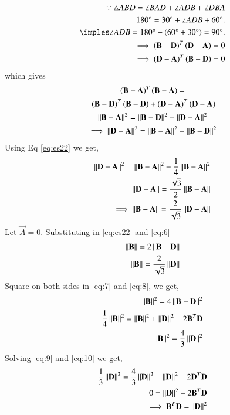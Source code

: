 \documentclass[journal,12pt,twocolumn]{IEEEtran}
\begin{document}
\begin{align}
\because \triangle ABD = \angle BAD + \angle ADB + \angle DBA\\
180\degree = 30\degree + \angle ADB + 60\degree.\\
\imples \angle ADB = 180\degree -\brak{60\degree + 30\degree} = 90\degree.\\
  \implies\brak{\vec{B-D}}^{T}\brak{\vec{D-A}}=0\\ \implies\brak{\vec{D-A}}^{T}\brak{\vec{B-D}} =0
\end{align}
which gives
\begin{multline}
    \brak{\vec{B-A}}^{T}\brak{\vec{B-A}} =\\\ \brak{\vec{B-D}}^{T}\brak{\vec{B-D}} + \brak{\vec{D-A}}^{T}\brak{\vec{D-A}}\\
    \norm{\vec{B-A}}^2=\norm{\vec{B-D}}^2 + \norm{\vec{D-A}}^2\\
    \implies\norm{\vec{D-A}}^2=\norm{\vec{B-A}}^2-\norm{\vec{B-D}}^2\label{eq:5}
\end{multline}
Using Eq \eqref{eq:es22} we get,
\begin{align}
\left\lVert\mathbf{D-A}\right\rVert^2=\left\lVert\mathbf{B-A}\right\rVert^2-\frac{1}{4}\left\lVert\mathbf{B-A}\right\rVert^2\label{eq:24}\\
 \left\lVert\mathbf{D-A}\right\rVert=\frac{\sqrt{3}}{2}\left\lVert\mathbf{B-A}\right\rVert\\
  \implies\left\lVert\mathbf{B-A}\right\rVert = \frac{2}{\sqrt{3}}\left\lVert\mathbf{D-A}\right\rVert\label{eq:6}
\end{align}
Let $\vec{A}=0$. Substituting in \eqref{eq:es22} and \eqref{eq:6}
\begin{align}
    \label{eq:7}\left\lVert\mathbf{B}\right\rVert=2\left\lVert\mathbf{B-D}\right\rVert\\
    \label{eq:8}\left\lVert\mathbf{B}\right\rVert=\frac{2}{\sqrt{3}}\left\lVert\mathbf{D}\right\rVert
\end{align}
Square on both sides in \eqref{eq:7} and \eqref{eq:8}, we get,
\begin{align}
    \left\lVert\mathbf{B}\right\rVert^2=4\left\lVert\mathbf{B-D}\right\rVert^2\\
    \frac{1}{4}\left\lVert\mathbf{B}\right\rVert^2=\left\lVert\mathbf{B}\right\rVert^2+\left\lVert\mathbf{D}\right\rVert^2-2\mathbf{B}^T\mathbf{D}\label{eq:9}\\
\left\lVert\mathbf{B}\right\rVert^2 = \frac{4}{3}\left\lVert\mathbf{D}\right\rVert^2\label{eq:10}
\end{align}
Solving \eqref{eq:9} and \eqref{eq:10} we get,
\begin{align}
    \frac{1}{3}\left\lVert\mathbf{D}\right\rVert^2=\frac{4}{3}\left\lVert\mathbf{D}\right\rVert^2+\left\lVert\mathbf{D}\right\rVert^2-2\mathbf{D}^T\mathbf{D}\\
    0=\left\lVert\mathbf{D}\right\rVert^2-2\mathbf{B}^T\mathbf{D}\\
     \implies\mathbf{B}^T\mathbf{D}=\left\lVert\mathbf{D}\right\rVert^2\label{eq:15}
\end{align}
\end{document}
